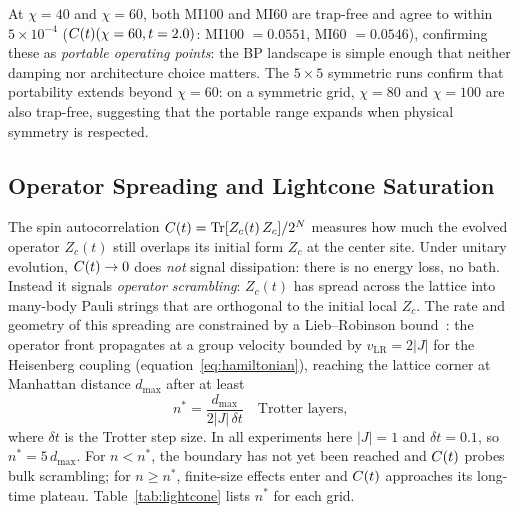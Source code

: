 At $\chi=40$ and $\chi=60$, both MI100 and MI60 are trap-free and agree to
within $5\times10^{-4}$ ($C(t)(\chi=60, t=2.0)$: MI100 $= 0.0551$,
MI60 $= 0.0546$), confirming these as \emph{portable operating points}: the BP
landscape is simple enough that neither damping nor architecture choice matters.
The $5\times5$ symmetric runs confirm that portability extends beyond
$\chi=60$: on a symmetric grid, $\chi=80$ and $\chi=100$ are also trap-free,
suggesting that the portable range expands when physical symmetry is respected.

\subsection{Operator Spreading and Lightcone Saturation}
\label{sec:lightcone}

The spin autocorrelation $C(t) = \mathrm{Tr}[Z_c(t)\,Z_c]/2^N$ measures how
much the evolved operator $Z_c(t)$ still overlaps its initial form $Z_c$ at
the center site.
Under unitary evolution, $C(t) \to 0$ does \emph{not} signal dissipation:
there is no energy loss, no bath.
Instead it signals \emph{operator scrambling}: $Z_c(t)$ has spread across
the lattice into many-body Pauli strings that are orthogonal to the initial
local $Z_c$.
The rate and geometry of this spreading are constrained by a Lieb--Robinson
bound~\citep{liebrobinson}: the operator front propagates at a group velocity
bounded by $v_{\mathrm{LR}} = 2|J|$ for the Heisenberg coupling
(equation~\eqref{eq:hamiltonian}), reaching the lattice corner at Manhattan
distance $d_{\mathrm{max}}$ after at least
\begin{equation}
  n^* = \frac{d_{\mathrm{max}}}{2|J|\,\delta t}
  \quad \text{Trotter layers,}
  \label{eq:nstar}
\end{equation}
where $\delta t$ is the Trotter step size.
In all experiments here $|J| = 1$ and $\delta t = 0.1$, so
$n^* = 5\,d_{\mathrm{max}}$.
For $n < n^*$, the boundary has not yet been reached and $C(t)$ probes
bulk scrambling; for $n \geq n^*$, finite-size effects enter and $C(t)$
approaches its long-time plateau.
Table~\ref{tab:lightcone} lists $n^*$ for each grid.

